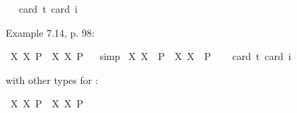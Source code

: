\begin{isabellebody}
\ \ \isamarkupfalse%
{\isacharbrackleft}card\ {\isacharprime}t{\isacharequal}{}{\isacharcomma}\ card\ i{\isacharequal}{}{\isacharbrackright}%
\isadelimproof
\ %
\endisadelimproof
%
\isatagproof
{}\isamarkupfalse%
\ %
%
\endisatagproof
{\isafoldproof}%
%
\isadelimproof
%
\endisadelimproof
%
\begin{isamarkuptext}%
Example 7.14, p. 98:%
\end{isamarkuptext}\isamarkuptrue%
\isamarkupfalse%
\ {\isachardoublequoteopen}{\isasymlfloor}{\isacharparenleft}{\isasymlambda}X{\isachardot}\ \isactrlbold {\isasymdiamond}\isactrlbold {\isasymexists}X{\isacharparenright}\ \isactrlbold {\isasymdown}{\isacharparenleft}P{\isacharcolon}{\isacharcolon}{\isasymup}{\isasymlangle}{\isasymzero}{\isasymrangle}{\isacharparenright}\ \isactrlbold {\isasymrightarrow}\ {\isacharparenleft}{\isasymlambda}X{\isachardot}\ \isactrlbold {\isasymexists}X{\isacharparenright}\ \isactrlbold {\isasymdown}P{\isasymrfloor}{\isachardoublequoteclose}%
\isadelimproof
\ %
\endisadelimproof
%
\isatagproof
{}\isamarkupfalse%
\ simp%
\endisatagproof
{\isafoldproof}%
%
\isadelimproof
%
\endisadelimproof
\isanewline
{}\isamarkupfalse%
\ {\isachardoublequoteopen}{\isasymlfloor}{\isacharparenleft}{\isasymlambda}X{\isachardot}\ \isactrlbold {\isasymdiamond}\isactrlbold {\isasymexists}X{\isacharparenright}\ \ {\isacharparenleft}P{\isacharcolon}{\isacharcolon}{\isasymup}{\isasymlangle}{\isasymzero}{\isasymrangle}{\isacharparenright}\ \isactrlbold {\isasymrightarrow}\ {\isacharparenleft}{\isasymlambda}X{\isachardot}\ \isactrlbold {\isasymexists}X{\isacharparenright}\ \ P{\isasymrfloor}{\isachardoublequoteclose}\ \isanewline
\ \ \isamarkupfalse%
{\isacharbrackleft}card\ {\isacharprime}t{\isacharequal}{}{\isacharcomma}\ card\ i{\isacharequal}{}{\isacharbrackright}%
\isadelimproof
\ %
\endisadelimproof
%
\isatagproof
{}\isamarkupfalse%
\ %
%
\endisatagproof
{\isafoldproof}%
%
\isadelimproof
%
\endisadelimproof
%
\begin{isamarkuptext}%
with other types for :%
\end{isamarkuptext}\isamarkuptrue%
\isamarkupfalse%
\ {\isachardoublequoteopen}{\isasymlfloor}{\isacharparenleft}{\isasymlambda}X{\isachardot}\ \isactrlbold {\isasymdiamond}\isactrlbold {\isasymexists}X{\isacharparenright}\ \isactrlbold {\isasymdown}{\isacharparenleft}P{\isacharcolon}{\isacharcolon}{\isasymup}{\isasymlangle}{\isasymup}{\isasymzero}{\isasymrangle}{\isacharparenright}\ \isactrlbold {\isasymrightarrow}\ {\isacharparenleft}{\isasymlambda}X{\isachardot}\ \isactrlbold {\isasymexists}X{\isacharparenright}\ \isactrlbold {\isasymdown}P{\isasymrfloor}{\isachardoublequoteclose}%

\end{isabellebody}
